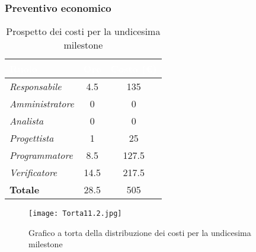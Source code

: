 \newpage
\subsubsection{Preventivo economico}

\begin{table}[H]
    \renewcommand\arraystretch{1.5}
    \centering
    \begin{tabular}{|l|c|c|}
    \hline
    \rowcolor[HTML]{036400}
    \textcolor{white}{\textbf{Ruolo}} & \multicolumn{1}{l|}{\textcolor{white}{\textbf{Ore}}} & \multicolumn{1}{l|}{\textcolor{white}{\textbf{Costo (€)}}} \\ \hline
    \rowcolor[HTML]{EFEFEF}\textit{Responsabile}   & 4.5    & 135    \\ \hline
    \rowcolor[HTML]{C0C0C0}\textit{Amministratore} & 0  & 0     \\ \hline
    \rowcolor[HTML]{EFEFEF}\textit{Analista}       & 0    & 0      \\ \hline
    \rowcolor[HTML]{C0C0C0}\textit{Progettista}    & 1    & 25     \\ \hline
    \rowcolor[HTML]{EFEFEF}\textit{Programmatore}  & 8.5   & 127.5    \\ \hline
    \rowcolor[HTML]{C0C0C0}\textit{Verificatore}   & 14.5   & 217.5    \\ \hline
    \rowcolor[HTML]{EFEFEF}\textbf{Totale}         & 28.5 & 505    \\ \hline
    \end{tabular}
    \caption{Prospetto dei costi per la undicesima milestone}
\end{table}

\begin{figure}[H]
    \texttt{[image: Torta11.2.jpg]}
    \caption{Grafico a torta della distribuzione dei costi per la undicesima milestone}
\end{figure}
